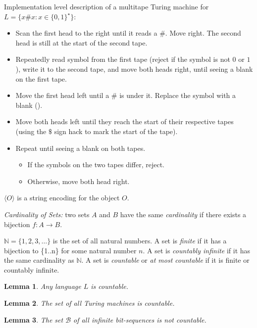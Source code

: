 \documentclass[letterpaper,landscape,11pt]{article}
\newtheorem{lemma}{Lemma}
\begin{document}
Implementation level description of a multitape Turing machine for $L = \{x\#x : x \in \{0, 1\}^\star\}$:
\begin{itemize}
	\item Scan the first head to the right until it reads a $\#$. Move right. The second head is still at the start of the second tape.
	\item Repeatedly read symbol from the first tape (reject if the symbol is not $0$ or $1$), write it to the second tape, and move both heads right, until seeing a blank on the first tape.
	\item Move the first head left until a $\#$ is under it. Replace the symbol with a blank (\textvisiblespace).
	\item Move both heads left until they reach the start of their respective tapes (using the $\$$ sign hack to mark the start of the tape).
	\item Repeat until seeing a blank on both tapes.
	\begin{itemize}
		\item If the symbols on the two tapes differ, reject.
		\item Otherwise, move both head right.
	\end{itemize}
\end{itemize}

$\langle O \rangle$ is a string encoding for the object $O$.

\emph{Cardinality of Sets:} two sets $A$ and $B$ have the same \emph{cardinality} if there exists a bijection $f : A \rightarrow B$.

$\mathbb{N} = \{1, 2, 3, \dots\}$ is the set of all natural numbers. A set is \emph{finite} if it has a bijection to \{1..n\} for some natural number $n$. A set is \emph{countably infinite} if it has the same cardinality as $\mathbb{N}$. A set is \emph{countable} or \emph{at most countable} if it is finite or countably infinite.

\begin{lemma}
	Any language $L$ is countable.
\end{lemma}

\begin{lemma}
	The set of all Turing machines is countable.
\end{lemma}

\begin{lemma}
	The set $\mathcal{B}$ of all infinite bit-sequences is not countable.
\end{lemma}
\end{document}
